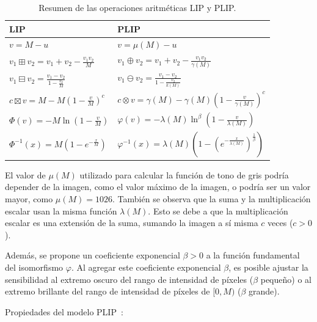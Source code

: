 \begin{table}
	\caption{Resumen de las operaciones aritm\'eticas LIP y PLIP.}
	\begin{center}
		\begin{tabular}{|l|l|}
			\hline 
			\textbf{LIP} & \textbf{PLIP}\\
			\hline
			$v=M-u$ & $v=\mu(M)-u$\\
			\hline
			$v_1\boxplus v_2=v_1+v_2-\frac{v_1v_2}{M}$ & $v_1\oplus v_2=v_1+v_2-\frac{v_1v_2}{\gamma(M)}$\\
			\hline
			$v_1\boxminus v_2=\frac{v_1-v_2}{1-\frac{v_2}{M}}$ & $v_1\ominus v_2=\frac{v_1-v_2}{1-\frac{v_2}{k(M)}}$\\
			\hline
			$c\boxtimes v=M-M(1-\frac{v}{M})^c$ & $c\otimes v=\gamma(M)-\gamma(M)(1-\frac{v}{\gamma(M)})^c$\\
			\hline
			$\varPhi(v)=-M\ln(1-\frac{v}{M})$ & $\varphi(v)=-\lambda(M)\ln^\beta(1-\frac{v}{\lambda(M)})$\\
			\hline
			$\varPhi^{-1}(x)=M\left(1-e^{-\frac{x}{M}}\right)$ & $\varphi^{-1}(x)=\lambda(M)\left(1-\left(e^{-\frac{x}{\lambda(M)}}\right)^{\frac{1}{\beta}}\right)$\\
			\hline
		\end{tabular}
	\end{center}
\end{table}

El valor de $\mu(M)$ utilizado para calcular la función de tono de gris podría depender de la imagen, como el valor máximo de la imagen, o podría ser un valor mayor, como $\mu(M) = 1026$. También se observa que la suma y la multiplicación escalar usan la misma función $\lambda(M)$. Esto se debe a que la multiplicación escalar es una extensión de la suma, sumando la imagen a sí misma $c$ veces ($c>0$).

Además, se propone un coeficiente exponencial $\beta>0$ a la función fundamental del isomorfismo $\varphi$. Al agregar este coeficiente exponencial $\beta$, es posible ajustar la sensibilidad al extremo oscuro del rango de intensidad de píxeles ($\beta$ pequeño) o al extremo brillante del rango de intensidad de píxeles de $[0, M)$ ($\beta$ grande).

Propiedades del modelo PLIP~\cite{panetta2010parameterized}:

